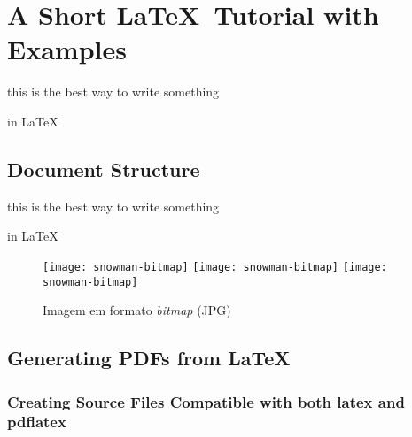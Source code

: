 

\chapter{A Short \LaTeX\ Tutorial with Examples}\label{cha:a_short_latex_tutorial_with_examples}

this is the best way
to write something

in LaTeX


\section{Document Structure}\label{sec:document_structure}

this is the best way
to write something

in LaTeX

\begin{figure}[H]
	\centering
	\texttt{[image: snowman-bitmap]}
	\texttt{[image: snowman-bitmap]}
	\texttt{[image: snowman-bitmap]}
	\caption{Imagem em formato \emph{bitmap} (JPG)}
	\label{fig:Figuras_Tree_silhouettes-bitmap}
\end{figure}

\section{Generating PDFs from \LaTeX}\label{sec:generating_pdfs_from_latex}

\subsection{Creating Source Files Compatible with both latex and pdflatex}\label{ssec:creating_source_files_compatible_with_both_latex_and_pdflatex}

